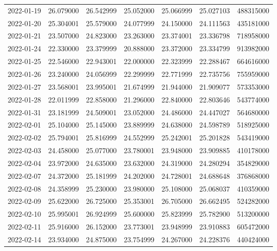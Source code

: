 \begin{tabular}{lrrrrrr}
2022-01-19 &   26.079000 &   26.542999 &   25.052000 &   25.066999 &   25.027103 &   488315000 \\
2022-01-20 &   25.304001 &   25.579000 &   24.077999 &   24.150000 &   24.111563 &   435181000 \\
2022-01-21 &   23.507000 &   24.823000 &   23.263000 &   23.374001 &   23.336798 &   718958000 \\
2022-01-24 &   22.330000 &   23.379999 &   20.888000 &   23.372000 &   23.334799 &   913982000 \\
2022-01-25 &   22.546000 &   22.943001 &   22.000000 &   22.323999 &   22.288467 &   664616000 \\
2022-01-26 &   23.240000 &   24.056999 &   22.299999 &   22.771999 &   22.735756 &   755959000 \\
2022-01-27 &   23.568001 &   23.995001 &   21.674999 &   21.944000 &   21.909077 &   573353000 \\
2022-01-28 &   22.011999 &   22.858000 &   21.296000 &   22.840000 &   22.803646 &   543774000 \\
2022-01-31 &   23.181999 &   24.509001 &   23.052000 &   24.486000 &   24.447027 &   564680000 \\
2022-02-01 &   25.104000 &   25.145000 &   23.889999 &   24.638000 &   24.598789 &   518925000 \\
2022-02-02 &   25.794001 &   25.816999 &   24.552999 &   25.242001 &   25.201828 &   543419000 \\
2022-02-03 &   24.458000 &   25.077000 &   23.780001 &   23.948000 &   23.909885 &   410178000 \\
2022-02-04 &   23.972000 &   24.635000 &   23.632000 &   24.319000 &   24.280294 &   354829000 \\
2022-02-07 &   24.372000 &   25.181999 &   24.202000 &   24.728001 &   24.688648 &   376868000 \\
2022-02-08 &   24.358999 &   25.230000 &   23.980000 &   25.108000 &   25.068037 &   410359000 \\
2022-02-09 &   25.622000 &   26.725000 &   25.353001 &   26.705000 &   26.662495 &   524282000 \\
2022-02-10 &   25.995001 &   26.924999 &   25.600000 &   25.823999 &   25.782900 &   513200000 \\
2022-02-11 &   25.916000 &   26.152000 &   23.773001 &   23.948999 &   23.910883 &   605472000 \\
2022-02-14 &   23.934000 &   24.875000 &   23.754999 &   24.267000 &   24.228376 &   440424000 \\

\end{tabular}
